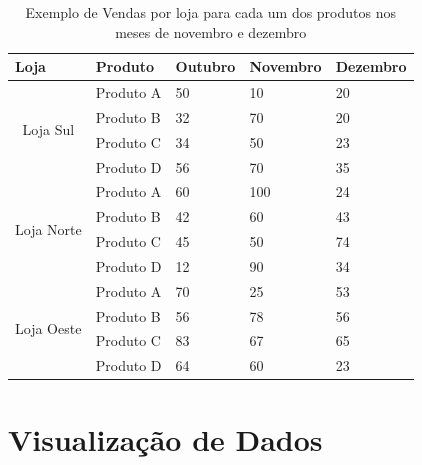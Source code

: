 \begin{table}[!ht]
\centering
\begin{tabular}{|c|l|l|l|l|}
\hline
\multicolumn{1}{|l|}{Loja}                        & Produto   & Outubro  & Novembro  & Dezembro \\ \hline
\multirow{4}{*}{Loja Sul}                         & Produto A & 50       & 10        & 20       \\ \cline{2-5} 
\multicolumn{1}{|l|}{}                            & Produto B & 32       & 70        & 20       \\ \cline{2-5} 
\multicolumn{1}{|l|}{}                            & Produto C & 34       & 50        & 23       \\ \cline{2-5} 
\multicolumn{1}{|l|}{}                            & Produto D & 56       & 70        & 35       \\ \hline
\multirow{4}{*}{Loja Norte}                       & Produto A & 60       & 100       & 24       \\ \cline{2-5} 
                                                  & Produto B & 42       & 60        & 43       \\ \cline{2-5} 
                                                  & Produto C & 45       & 50        & 74       \\ \cline{2-5} 
                                                  & Produto D & 12       & 90        & 34       \\ \hline
\multicolumn{1}{|l|}{\multirow{4}{*}{Loja Oeste}} & Produto A & 70       & 25        & 53       \\ \cline{2-5} 
\multicolumn{1}{|l|}{}                            & Produto B & 56       & 78        & 56       \\ \cline{2-5} 
\multicolumn{1}{|l|}{}                            & Produto C & 83       & 67        & 65       \\ \cline{2-5} 
\multicolumn{1}{|l|}{}                            & Produto D & 64       & 60        & 23       \\ \hline
\end{tabular}
\caption{Exemplo de Vendas por loja para cada um dos produtos nos meses de novembro e dezembro}
\label{after-pivoting}
\end{table}



\section {Visualização de Dados}

